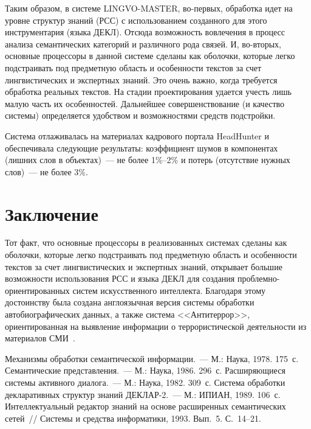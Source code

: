\begin{multicols}{2}
 Таким образом, в системе LINGVO-MASTER, во-пер\-вых, обработка
идет на уровне структур знаний (РСС) с использованием созданного для этого
инструментария (языка ДЕКЛ). Отсюда возможность вовлечения в процесс
анализа семантических категорий и различного рода связей. И, во-вто\-рых,
основные процессоры в данной системе сделаны как оболочки, которые легко
подстраивать под предметную область и особенности текстов за счет
лингвистических и экспертных знаний. Это очень важно, когда требуется
обработка реальных текстов. На стадии проектирования удается учесть лишь
малую часть их особенностей. Дальнейшее совершенствование (и качество
системы) определяется удобством и возможностями средств подстройки.

 Система отлаживалась на материалах кадрового портала HeadHunter и
обеспечивала следующие результаты: коэффициент шумов в компонентах
(лишних слов в объектах)~--- не более 1\%--2\% и потерь (отсутствие нужных
слов)~--- не более 3\%.

\vspace*{-6pt}

\section{Заключение} %

 Тот факт, что основные процессоры в реализованных системах сделаны
как оболочки, которые легко подстраивать под предметную область и
особенности текстов за счет лингвистических и экспертных знаний, открывает
большие возможности использования РСС и языка ДЕКЛ для создания
проб\-лем\-но-ори\-ен\-ти\-ро\-ван\-ных систем искусственного интеллекта. Благодаря
этому достоинству была создана англоязычная версия системы обработки
автобиографических данных, а также система <<Антитеррор>>,
ориентированная на выявление информации о террористической деятельности
из материалов СМИ~\cite{ma-l11, ma-l12}.

\vspace*{-6pt}


{\small\frenchspacing
 {%
 \begin{thebibliography}{99}

Механизмы обработки семантической информации.~--- М.: Наука, 1978. 175~с.
 Семантические представления.~--- М.: Наука, 1986. 296~с.
 Расширяющиеся системы активного диалога.~--- М.:
Наука, 1982. 309~с.
Сис\-те\-ма обработки декларативных структур знаний \mbox{ДЕКЛАР-2}.~--- М.:
ИПИАН, 1989. 106~с.
Интеллектуальный редактор знаний на основе расширенных семантических
сетей~// Системы и средства информатики, 1993.  Вып.~5.
С.~14--21.


\end{thebibliography}}}
\end{multicols}
